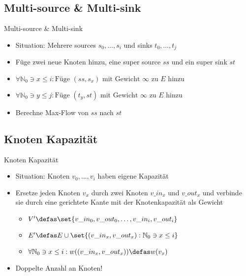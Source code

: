 \subsection{Multi-source \& Multi-sink}
\begin{frame}{Multi-source \& Multi-sink}
    \begin{itemize}
        \pause\item Situation: Mehrere sources $s_0,\dots,s_i$ und sinks $t_0,\dots,t_j$
        \pause\item Füge zwei neue Knoten hinzu, eine super source $ss$ und ein super sink $st$
        \pause\item \(\forall \mathbb{N}_0 \ni x \leq i : \text{Füge } (ss, s_x) \text{ mit
        Gewicht $\infty$ zu $E$ hinzu}\)
        \item \(\forall \mathbb{N}_0 \ni y \leq j : \text{Füge } (t_y, st) \text{ mit
        Gewicht $\infty$ zu $E$ hinzu}\)
        \pause\item Berechne Max-Flow von $ss$ nach $st$
    \end{itemize}
\end{frame}

\subsection{Knoten Kapazität}
\begin{frame}{Knoten Kapazität}
    \begin{itemize}
        \pause\item Situation: Knoten $v_0,\dots,v_i$ haben eigene Kapazität
        \pause\item Ersetze jeden Knoten $v_x$ durch zwei Knoten $v\_in_x$ und $v\_out_x$ und verbinde sie durch eine gerichtete Kante mit der Knotenkapazität als Gewicht
		\begin{itemize}        
        \pause\item \(V' \defas \set{v\_in_0, v\_out_0, \dots, v\_in_i, v\_out_i}\)
        \pause\item \(E' \defas E \cup \set{(v\_in_x, v\_out_x) : \mathbb{N}_0 \ni x \leq i}\)
        \pause\item \(\forall \mathbb{N}_0 \ni x \leq i : w((v\_in_x, v\_out_x)) \defas w(v_x)\)
        \end{itemize}
        \pause\item Doppelte Anzahl an Knoten!
    \end{itemize}
\end{frame}

